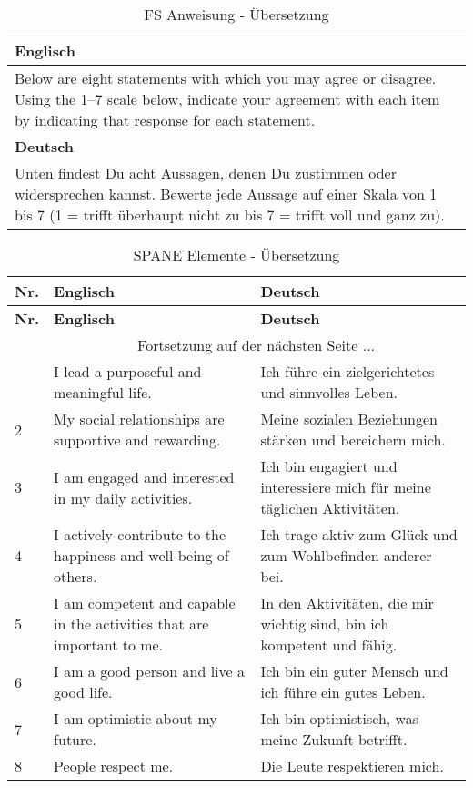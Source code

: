 \begin{center}
    \begin{longtable}[t]{|p{15 cm}|}
    \caption{FS Anweisung - Übersetzung} \\ \hline
        \textbf{Englisch} \\ \hline
        Below are eight statements with which you may agree or disagree. Using the 1–7 scale below, indicate your agreement with each item by indicating that response for each statement. \\ \hline
        \textbf{Deutsch} \\ \hline 
        Unten findest Du acht Aussagen, denen Du zustimmen oder widersprechen kannst. Bewerte jede Aussage auf einer Skala von 1 bis 7 (1 = trifft überhaupt nicht zu bis 7 = trifft voll und ganz zu). \\ \hline   
    \end{longtable}
	\label{tab:FsAnweisung}
\end{center}

\begin{center}
    \begin{longtable}[t]{|p{0.8 cm}|p{6.6 cm}|p{6.6 cm}|}
    \caption{SPANE Elemente - Übersetzung} \\ \hline
        \textbf{Nr.} & \textbf{Englisch} & \textbf{Deutsch} \\ \hline
        \endfirsthead
        \hline
        \textbf{Nr.} & \textbf{Englisch} & \textbf{Deutsch} \\ \hline
        \endhead 
        & \multicolumn{2}{|c|}{Fortsetzung auf der nächsten Seite $...$ } \\ \hline
        \endfoot
        \hline
        \endlastfoot
        1 & I lead a purposeful and meaningful life. & Ich führe ein zielgerichtetes und sinnvolles Leben.\\
        2 & My social relationships are supportive and rewarding. & Meine sozialen Beziehungen stärken und bereichern mich. \\
        3 & I am engaged and interested in my daily activities. & Ich bin engagiert und interessiere mich für meine täglichen Aktivitäten.\\
        4 & I actively contribute to the happiness and well-being of others. & Ich trage aktiv zum Glück und zum Wohlbefinden anderer bei.\\
        5 & I am competent and capable in the activities that are important to me. & In den Aktivitäten, die mir wichtig sind, bin ich kompetent und fähig.\\
        6 & I am a good person and live a good life. & Ich bin ein guter Mensch und ich führe ein gutes Leben. \\
        7 & I am optimistic about my future. & Ich bin optimistisch, was meine Zukunft betrifft.\\
        8 & People respect me. & Die Leute respektieren mich.\\        
    \end{longtable}
	\label{tab:FsElemente}
\end{center}





